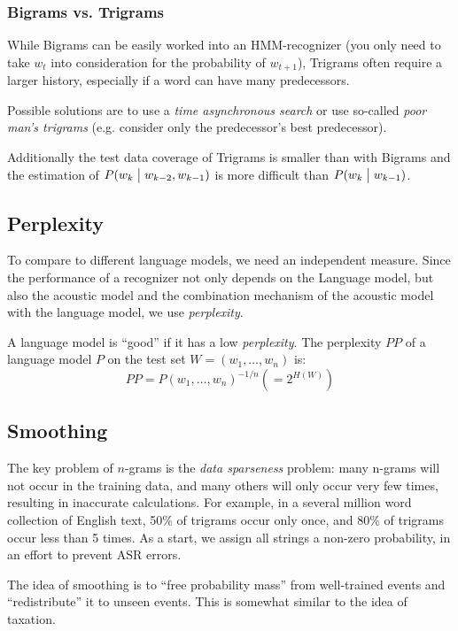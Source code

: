 \subsubsection{Bigrams vs. Trigrams}

While Bigrams can be easily worked into an HMM-recognizer (you only need to take $w_t$ into consideration for the probability of $w_{t+1}$), Trigrams often require a larger history, especially if a word can have many predecessors.

Possible solutions are to use a \emph{time asynchronous search} or use so-called \emph{poor man's trigrams} (e.g. consider only the predecessor's best predecessor).

Additionally the test data coverage of Trigrams is smaller than with Bigrams and the estimation of  $P(w_k \bigm| w_{k - 2}, w_{k-1})$ is more difficult than $P(w_k \bigm|  w_{k-1})$.

\subsection{Perplexity}

To compare to different language models, we need an independent measure. Since the performance of a recognizer not only depends on the Language model, but also the acoustic model and the combination mechanism of the acoustic model with the language model, we use \emph{perplexity}.

A language model is ``good'' if it has a low \textit{perplexity}. The perplexity $PP$ of a language model $P$ on the test set $W = (w_1, \ldots, w_n)$ is:
\[
    PP = P(w_1, \ldots, w_n)^{-1/n} ( = 2^{H(W)})
\]

\subsection{Smoothing}

The key problem of $n$-grams is the \textit{data sparseness} problem: many n-grams will not occur in the training data, and many others will only occur very few times, resulting in inaccurate calculations. For example, in a several million word collection of English text, 50\% of trigrams occur only once, and 80\% of trigrams occur less than 5 times. As a start, we assign all strings a non-zero probability, in an effort to prevent ASR errors.

The idea of smoothing is to ``free probability mass'' from well-trained events and ``redistribute'' it to unseen events. This is somewhat similar to the idea of taxation.

